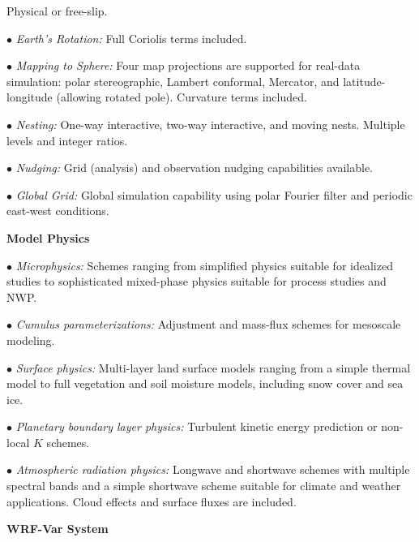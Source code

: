 \begin{description}
Physical or free-slip.
%
\item{$\bullet$} {\em Earth's Rotation:}
Full Coriolis terms included.
%
\item{$\bullet$} {\em Mapping to Sphere:} 
Four map projections are supported for real-data simulation: 
polar stereographic, Lambert conformal, Mercator, and 
latitude-longitude (allowing rotated pole). 
Curvature terms included.
%
\item{$\bullet$} {\em Nesting:} 
One-way interactive, two-way interactive, and moving nests.
Multiple levels and integer ratios.
%
\item{$\bullet$} {\em Nudging:}
Grid (analysis) and observation nudging capabilities available. 
%
\item{$\bullet$} {\em Global Grid:}
Global simulation capability using polar Fourier filter and 
periodic east-west conditions. 
\end{description}

\newpage
\vskip 12pt
{\noindent\bf Model Physics}
\vskip 12pt

\begin{description}
\setlength{\itemsep}{-5pt}
\item{$\bullet$} {\em Microphysics:} Schemes ranging from simplified
physics suitable for idealized studies to sophisticated mixed-phase
physics suitable for process studies and NWP.
%
\item{$\bullet$} {\em Cumulus parameterizations:}
Adjustment and mass-flux schemes for mesoscale modeling.
%
\item{$\bullet$} {\em Surface physics:}
Multi-layer land surface models ranging from a simple thermal model to full
vegetation and soil moisture models, including snow cover and sea ice.
%
\item{$\bullet$} {\em Planetary boundary layer physics:}
Turbulent kinetic energy prediction or non-local $K$ schemes.
%
\item{$\bullet$} {\em Atmospheric radiation physics:} 
Longwave and shortwave schemes with multiple spectral bands and a 
simple shortwave scheme suitable for climate and weather applications.  
Cloud effects and surface fluxes are included.
\end{description}

\vskip 12pt
{\noindent\bf WRF-Var System}
\vskip 12pt

